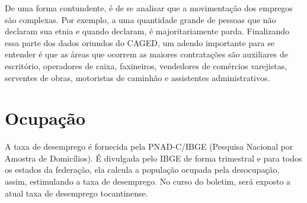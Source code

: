 \par De uma forma contundente, é de se analisar que a movimentação dos empregos são complexas. Por exemplo, a uma quantidade grande de pessoas que não declaram sua etnia e quando declaram, é majoritariamente parda. Finalizando essa parte dos dados oriundos do CAGED, um adendo importante para se entender é que as áreas que ocorrem as maiores contratações são auxiliares de escritório, operadores de caixa, faxineiros, vendedores de comércios varejistas, serventes de obras, motoristas de caminhão e assistentes administrativos.


\section{Ocupação}

\par A taxa de desemprego é fornecida pela PNAD-C/IBGE (Pesquisa Nacional por Amostra de Domicílios). É divulgada pelo IBGE de forma trimestral e para todos os estados da federação, ela calcula a população ocupada pela desocupação, assim, estimulando a taxa de desemprego. No curso do boletim, será exposto a atual taxa de desemprego tocantinense.

